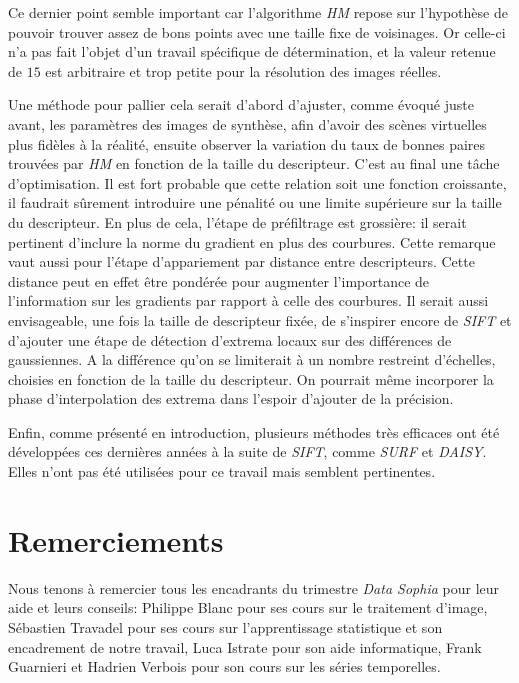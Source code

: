 \documentclass[
	a4paper, %
	10pt, %
	unnumberedsections, %
	twoside, %
]{LTJournalArticle}
\begin{document}
Ce dernier point semble important car l'algorithme \textit{HM} repose sur l'hypothèse
de pouvoir trouver assez de bons points avec une taille fixe de voisinages. Or celle-ci
n'a pas fait l'objet d'un travail spécifique de détermination, et la valeur retenue de $15$
est arbitraire et trop petite pour la résolution des images réelles.

Une méthode pour pallier cela serait d'abord d'ajuster, comme évoqué juste avant, les paramètres des
images de synthèse, afin d'avoir des scènes virtuelles plus fidèles à la réalité, ensuite
observer la variation du taux de bonnes paires trouvées par \textit{HM} en fonction de la taille du descripteur. C'est au final une tâche d'optimisation.
Il est fort probable que cette relation soit une fonction croissante,
il faudrait sûrement introduire une pénalité ou une limite
supérieure sur la taille du descripteur.
En plus de cela, l'étape de préfiltrage est grossière: il serait pertinent d'inclure
la norme du gradient en plus des courbures. Cette remarque vaut aussi pour l'étape
d'appariement par distance entre descripteurs. Cette distance peut en effet être
pondérée pour augmenter l'importance de l'information sur les gradients par rapport
à celle des courbures.
Il serait aussi envisageable, une fois la taille de descripteur fixée, de s'inspirer
encore de \textit{SIFT} et d'ajouter une étape de détection d'extrema
locaux sur des différences de gaussiennes. A la différence qu'on se limiterait à
un nombre restreint d'échelles, choisies en fonction de la taille du descripteur.
On pourrait même incorporer la phase d'interpolation des extrema dans l'espoir
d'ajouter de la précision.

Enfin, comme présenté en introduction, plusieurs méthodes très efficaces ont été développées
ces dernières années à la suite de \textit{\textit{SIFT}}, comme \textit{SURF} et \textit{\textit{DAISY}}.
Elles n'ont pas été utilisées pour ce travail mais semblent pertinentes.

\section{Remerciements}

Nous tenons à remercier tous les encadrants du trimestre \textit{Data Sophia}
pour leur aide et leurs conseils: Philippe Blanc pour ses cours sur le traitement d'image,
Sébastien Travadel pour ses cours sur l'apprentissage statistique et son encadrement de notre travail,
Luca Istrate pour son aide informatique, Frank Guarnieri et Hadrien Verbois pour son cours sur
les séries temporelles.
\end{document}
